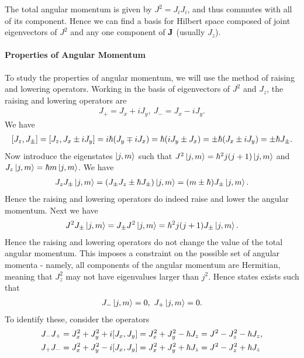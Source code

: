 The total angular momentum is given by $J^{2} = J_{i}J_{i}$, and thus commutes with all of its component. Hence we can find a basis for Hilbert space composed of joint eigenvectors of $J^{2}$ and any one component of $\vb{J}$ (usually $J_{z}$).

\paragraph{Properties of Angular Momentum}
To study the properties of angular momentum, we will use the method of raising and lowering operators. Working in the basis of eigenvectors of $J^{2}$ and $J_{z}$, the raising and lowering operators are
\begin{align*}
	J_{+} = J_{x} + iJ_{y},\ J_{-} = J_{x} - iJ_{y}.
\end{align*}
We have
\begin{align*}
	\comm{J_{z}}{J_{\pm}} = \comm{J_{z}}{J_{x} \pm iJ_{y}} = i\hbar(J_{y} \mp iJ_{x}) = \hbar(iJ_{y} \pm J_{x}) = \pm\hbar(J_{x} \pm iJ_{y}) = \pm\hbar J_{\pm}.
\end{align*}
Now introduce the eigenstates $\ket{j, m}$ such that $J^{2}\ket{j, m} = \hbar^{2}j(j + 1)\ket{j, m}$ and $J_{z}\ket{j, m} = \hbar m\ket{j, m}$. We have
\begin{align*}
	J_{z}J_{\pm}\ket{j, m} = (J_{\pm}J_{z} \pm \hbar J_{\pm})\ket{j, m} = (m \pm \hbar)J_{\pm}\ket{j, m}.
\end{align*}
Hence the raising and lowering operators do indeed raise and lower the angular momentum. Next we have
\begin{align*}
	J^{2}J_{\pm}\ket{j, m} = J_{\pm}J^{2}\ket{j, m} = \hbar^{2}j(j + 1)J_{\pm}\ket{j, m}.
\end{align*}
Hence the raising and lowering operators do not change the value of the total angular momentum. This imposes a constraint on the possible set of angular momenta - namely, all components of the angular momentum are Hermitian, meaning that $J_{z}^{2}$ may not have eigenvalues larger than $j^{2}$. Hence states exists such that
\begin{align*}
	J_{-}\ket{j, m} = 0,\ J_{+}\ket{j, m} = 0.
\end{align*}
To identify these, consider the operators
\begin{align*}
	J_{-}J_{+} &= J_{x}^{2} + J_{y}^{2} + i\comm{J_{x}}{J_{y}} = J_{x}^{2} + J_{y}^{2} - \hbar J_{z} = J^{2} - J_{z}^{2} - \hbar J_{z}, \\
	J_{+}J_{-} &= J_{x}^{2} + J_{y}^{2} - i\comm{J_{x}}{J_{y}} = J_{x}^{2} + J_{y}^{2} + \hbar J_{z} = J^{2} - J_{z}^{2} + \hbar J_{z}
\end{align*}
